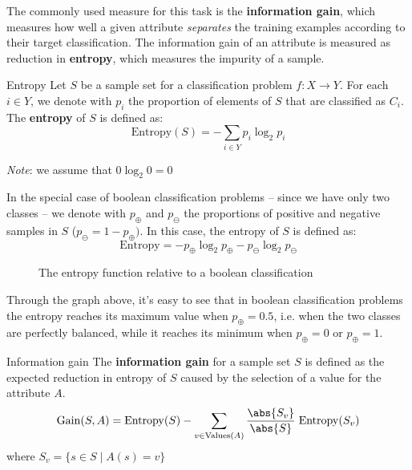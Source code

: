\documentclass[a4paper, 12pt]{report}
\begin{document}
    The commonly used measure for this task is the \textbf{information gain}, which measures how well a given attribute \textit{separates} the training examples according to their target classification. The information gain of an attribute is measured as reduction in \textbf{entropy}, which measures the impurity of a sample. 

    \begin{frameddefn}{Entropy}
        Let $S$ be a sample set for a classification problem $f : X \to Y$. For each $i \in Y$, we denote with $p_i$ the proportion of elements of $S$ that are classified as $C_i$. The \textbf{entropy} of $S$ is defined as:
        \[\mathrm{Entropy}(S) = - \sum_{i \in Y} p_i \log_2 p_i\]

        \textit{Note}: we assume that $0 \log_2 0 = 0$
    \end{frameddefn}

    In the special case of boolean classification problems -- since we have only two classes -- we denote with $p_{\oplus}$ and $p_{\ominus}$ the proportions of positive and negative samples in $S$ ($p_{\ominus} = 1-p_{\oplus})$. In this case, the entropy of $S$ is defined as:
    \[\mathrm{Entropy} = -p_\oplus \log_2 p_\oplus - p_\ominus \log_2 p_\ominus\]

    \begin{figure}[H]
        \centering
        \caption{The entropy function relative to a boolean classification}
    \end{figure}

    Through the graph above, it's easy to see that in boolean classification problems the entropy reaches its maximum value when $p_\oplus = 0.5$, i.e. when the two classes are perfectly balanced, while it reaches its minimum when $p_\oplus = 0$ or $p_\oplus = 1$. 

    \begin{frameddefn}{Information gain}
        The \textbf{information gain} for a sample set $S$ is defined as the expected reduction in entropy of $S$ caused by the selection of a value for the attribute $A$.
        \[\mathrm{Gain}(S,A) = \mathrm{Entropy}(S) - \sum_{v \in \mathrm{Values}(A)} \frac{\abs{S_v}}{\abs{S}} \; \mathrm{Entropy}(S_v)\]
        where $S_v = \{s \in S \mid A(s) = v\}$
    \end{frameddefn}
\end{document}
